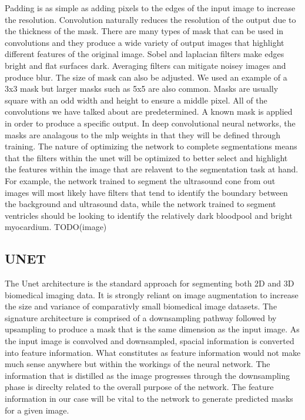 \documentclass[12pt]{article}
\begin{document}
Padding is as simple as adding pixels to the edges of the input image to increase the resolution.
Convolution naturally reduces the resolution of the output due to the thickness of the mask.
There are many types of mask that can be used in convolutions and they produce a wide variety of output images that highlight different features of the original image.
Sobel and laplacian filters make edges bright and flat surfaces dark. Averaging filters can mitigate noisey images and produce blur.
The size of mask can also be adjusted. We used an example of a 3x3 mask but larger masks such as 5x5 are also common.
Masks are usually square with an odd width and height to ensure a middle pixel. All of the convolutions we have talked about are predetermined.
A known mask is applied in order to produce a specific output. In deep convolutional neural networks, the masks are analagous to the mlp weights in that they will be defined through training.
The nature of optimizing the network to complete segmentations means that the filters within the unet will be optimized to better select and highlight the features within the image that are relavent to the segmentation task at hand.
For example, the network trained to segment the ultrasound cone from out images will most likely have filters that tend to identify the boundary between the background and ultrasound data,
while the network trained to segment ventricles should be looking to identify the relatively dark bloodpool and bright myocardium.
TODO(image)

\subsection{UNET}
The Unet architecture is the standard approach for segmenting both 2D and 3D biomedical imaging data.
It is strongly reliant on image augmentation to increase the size and variance of comparativly small biomedical image datasets.
The signature architecture is comprised of a downsampling pathway followed by upsampling to produce a mask that is the same dimension as the input image.
As the input image is convolved and downsampled, spacial information is converted into feature information.
What constitutes as feature information would not make much sense anywhere but within the workings of the neural network.
The information that is distilled as the image progresses through the downsampling phase is direclty related to the overall purpose of the network. The feature information in our case will be vital to the network to generate predicted masks for a given image.
\end{document}
